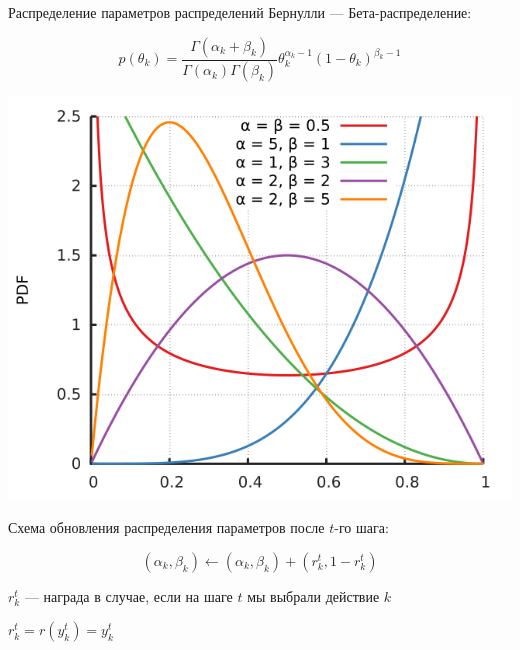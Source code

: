 \documentclass[fullscreen=true, bookmarks=true, hyperref={pdfencoding=unicode}]{beamer}
\begin{document}
\begin{frame}
  Распределение параметров распределений Бернулли — Бета-распределение:

  $$ p(\theta_k) = \frac{\Gamma(\alpha_k + \beta_k)}{\Gamma(\alpha_k)\Gamma(\beta_k)}
     \theta_k^{\alpha_k - 1} (1-\theta_k)^{\beta_k - 1}$$

     \begin{center}
       \includegraphics[keepaspectratio,
                        width=.5\paperwidth]{650px-Beta_distribution_pdf.png}
     \end{center}

  Схема обновления распределения параметров после $t$-го шага:

  $$ (\alpha_k, \beta_k) \leftarrow (\alpha_k, \beta_k) + (r^t_k,1 - r^t_k) $$

  $r^t_k$ — награда в случае, если на шаге $t$ мы выбрали действие $k$

  $r^t_k = r(y^t_k) = y^t_k$
\end{frame}
\end{document}

